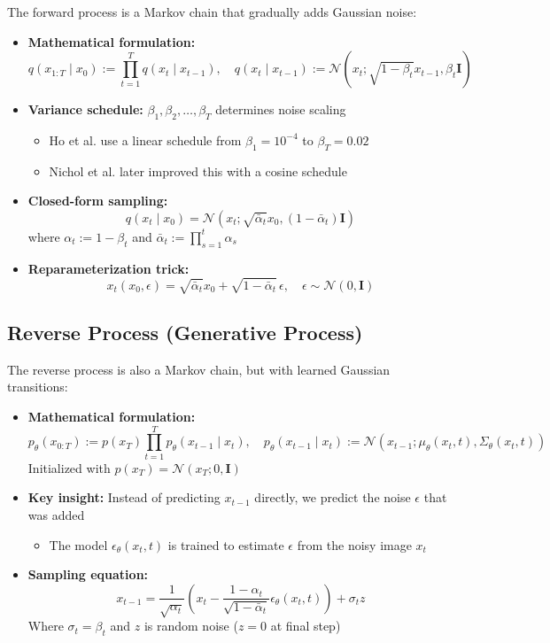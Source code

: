 The forward process is a Markov chain that gradually adds Gaussian noise:

\begin{itemize}
    \item \textbf{Mathematical formulation:}
    \[
    q(x_{1:T} \mid x_0) := \prod_{t=1}^{T} q(x_t \mid x_{t-1}), \quad q(x_t \mid x_{t-1}) := \mathcal{N}(x_t; \sqrt{1 - \beta_t} x_{t-1}, \beta_t \mathbf{I})
    \]
    
    \item \textbf{Variance schedule:} $\beta_1, \beta_2, \dots, \beta_T$ determines noise scaling
    \begin{itemize}
        \item Ho et al. use a linear schedule from $\beta_1 = 10^{-4}$ to $\beta_T = 0.02$
        \item Nichol et al. later improved this with a cosine schedule
    \end{itemize}
    
    \item \textbf{Closed-form sampling:}
    \[
    q(x_t \mid x_0) = \mathcal{N}(x_t; \sqrt{\bar{\alpha}_t} x_0, (1 - \bar{\alpha}_t) \mathbf{I})
    \]
    where $\alpha_t := 1 - \beta_t$ and $\bar{\alpha}_t := \prod_{s=1}^{t} \alpha_s$
    
    \item \textbf{Reparameterization trick:}
    \[
    x_t(x_0, \epsilon) = \sqrt{\bar{\alpha}_t} x_0 + \sqrt{1 - \bar{\alpha}_t} \, \epsilon, \quad \epsilon \sim \mathcal{N}(0, \mathbf{I})
    \]
\end{itemize}

\subsection*{Reverse Process (Generative Process)}

The reverse process is also a Markov chain, but with learned Gaussian transitions:

\begin{itemize}
    \item \textbf{Mathematical formulation:}
    \[
    p_\theta(x_{0:T}) := p(x_T) \prod_{t=1}^{T} p_\theta(x_{t-1} \mid x_t), \quad p_\theta(x_{t-1} \mid x_t) := \mathcal{N}(x_{t-1}; \mu_\theta(x_t, t), \Sigma_\theta(x_t, t))
    \]
    Initialized with $p(x_T) = \mathcal{N}(x_T; 0, \mathbf{I})$
    
    \item \textbf{Key insight:} Instead of predicting $x_{t-1}$ directly, we predict the noise $\epsilon$ that was added
    \begin{itemize}
        \item The model $\epsilon_\theta(x_t, t)$ is trained to estimate $\epsilon$ from the noisy image $x_t$
    \end{itemize}
    
    \item \textbf{Sampling equation:}
    \[
    x_{t-1} = \frac{1}{\sqrt{\alpha_t}} \left( x_t - \frac{1 - \alpha_t}{\sqrt{1 - \bar{\alpha}_t}} \epsilon_\theta(x_t, t) \right) + \sigma_t z
    \]
    Where $\sigma_t = \beta_t$ and $z$ is random noise ($z = 0$ at final step)
\end{itemize}


